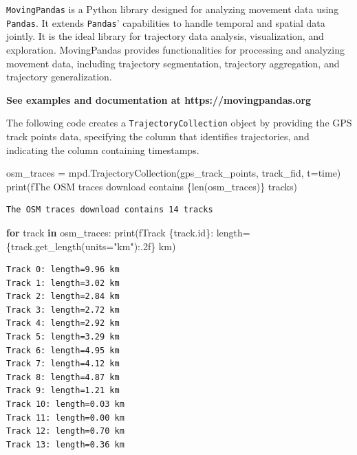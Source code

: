 \documentclass[
  letterpaper,
  DIV=11,
  numbers=noendperiod]{scrreprt}
\newenvironment{Shaded}{\begin{snugshade}}{\end{snugshade}}
\newcommand{\BuiltInTok}[1]{\textcolor[rgb]{0.00,0.23,0.31}{#1}}
\newcommand{\ControlFlowTok}[1]{\textcolor[rgb]{0.00,0.23,0.31}{\textbf{#1}}}
\newcommand{\KeywordTok}[1]{\textcolor[rgb]{0.00,0.23,0.31}{\textbf{#1}}}
\newcommand{\NormalTok}[1]{\textcolor[rgb]{0.00,0.23,0.31}{#1}}
\newcommand{\OperatorTok}[1]{\textcolor[rgb]{0.37,0.37,0.37}{#1}}
\newcommand{\SpecialCharTok}[1]{\textcolor[rgb]{0.37,0.37,0.37}{#1}}
\newcommand{\SpecialStringTok}[1]{\textcolor[rgb]{0.13,0.47,0.30}{#1}}
\newcommand{\StringTok}[1]{\textcolor[rgb]{0.13,0.47,0.30}{#1}}
\begin{document}
\texttt{MovingPandas} is a Python library designed for analyzing
movement data using \texttt{Pandas}. It extends \texttt{Pandas}'
capabilities to handle temporal and spatial data jointly. It is the
ideal library for trajectory data analysis, visualization, and
exploration. MovingPandas provides functionalities for processing and
analyzing movement data, including trajectory segmentation, trajectory
aggregation, and trajectory generalization.

\textbf{See examples and documentation at https://movingpandas.org}

The following code creates a \texttt{TrajectoryCollection} object by
providing the GPS track points data, specifying the column that
identifies trajectories, and indicating the column containing
timestamps.

\begin{Shaded}
\begin{Highlighting}[]
\NormalTok{osm\_traces }\OperatorTok{=}\NormalTok{ mpd.TrajectoryCollection(gps\_track\_points, }\StringTok{\textquotesingle{}track\_fid\textquotesingle{}}\NormalTok{, t}\OperatorTok{=}\StringTok{\textquotesingle{}time\textquotesingle{}}\NormalTok{)}
\BuiltInTok{print}\NormalTok{(}\SpecialStringTok{f\textquotesingle{}The OSM traces download contains }\SpecialCharTok{\{}\BuiltInTok{len}\NormalTok{(osm\_traces)}\SpecialCharTok{\}}\SpecialStringTok{ tracks\textquotesingle{}}\NormalTok{)}
\end{Highlighting}
\end{Shaded}

\begin{verbatim}
The OSM traces download contains 14 tracks
\end{verbatim}

\begin{Shaded}
\begin{Highlighting}[]
\ControlFlowTok{for}\NormalTok{ track }\KeywordTok{in}\NormalTok{ osm\_traces: }
    \BuiltInTok{print}\NormalTok{(}\SpecialStringTok{f\textquotesingle{}Track }\SpecialCharTok{\{}\NormalTok{track}\SpecialCharTok{.}\BuiltInTok{id}\SpecialCharTok{\}}\SpecialStringTok{: length=}\SpecialCharTok{\{}\NormalTok{track}\SpecialCharTok{.}\NormalTok{get\_length(units}\OperatorTok{=}\StringTok{"km"}\NormalTok{)}\SpecialCharTok{:.2f\}}\SpecialStringTok{ km\textquotesingle{}}\NormalTok{)}
\end{Highlighting}
\end{Shaded}

\begin{verbatim}
Track 0: length=9.96 km
Track 1: length=3.02 km
Track 2: length=2.84 km
Track 3: length=2.72 km
Track 4: length=2.92 km
Track 5: length=3.29 km
Track 6: length=4.95 km
Track 7: length=4.12 km
Track 8: length=4.87 km
Track 9: length=1.21 km
Track 10: length=0.03 km
Track 11: length=0.00 km
Track 12: length=0.70 km
Track 13: length=0.36 km
\end{verbatim}
\end{document}
